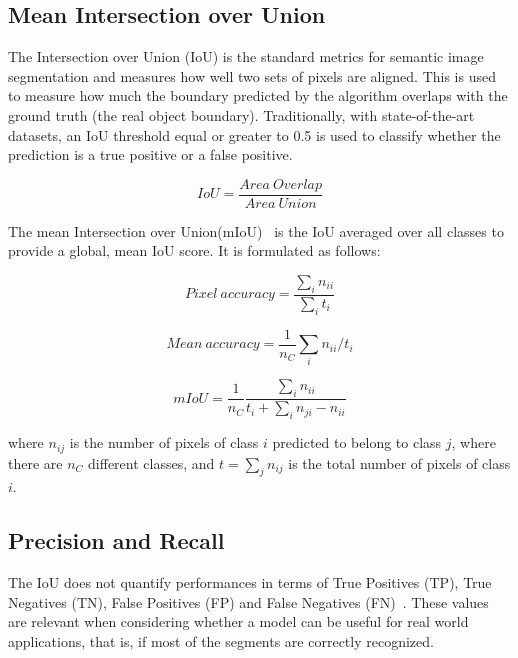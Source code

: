 \documentclass[oneside, english, bibtex]{kththesis}
\begin{document}
\subsection{Mean Intersection over Union}

The Intersection over Union (IoU) is the standard metrics for semantic image segmentation and measures how well two sets of pixels are aligned. This is used to measure how much the boundary predicted by the algorithm overlaps with the ground truth (the real object boundary). Traditionally, with state-of-the-art datasets, an IoU threshold equal or greater to 0.5 is used to classify whether the prediction is a true positive or a false positive.

\begin{equation}
	IoU = \frac{Area \: Overlap}{Area \: Union}
  	\label{eqn:iou}
\end{equation}

The mean Intersection over Union(mIoU)~\cite{DBLP:journals/corr/LongSD14} is the IoU averaged over all classes to provide a global, mean IoU score. It is formulated as follows:

\begin{equation}
	Pixel \: accuracy = \frac{\sum_{i} n_{ii}}{\sum_{i}t_i}
  	\label{eqn:pixelacc}
\end{equation}

\begin{equation}
	Mean \: accuracy = \frac{1}{n_C} \sum_{i} n_{ii} / t_i
  	\label{eqn:meanacc}
\end{equation}

\begin{equation}
	mIoU = \frac{1}{n_C} \frac{\sum_{i} n_{ii}}{t_i + \sum_{i} n_{ji} - n_{ii}}
  	\label{eqn:meanIoU}
\end{equation}

where $n_{ij}$ is the number of pixels of class $i$ predicted to belong to class $j$, where there are $n_{C}$ different classes, and $t = \sum_{j} n_{ij}$ is the total number of pixels of class $i$.

\subsection{Precision and Recall}

The IoU does not quantify performances in terms of True Positives (TP), True Negatives (TN), False Positives (FP) and False Negatives (FN)~\cite{davis2006relationship}. These values are relevant when considering whether a model can be useful for real world applications, that is, if most of the segments are correctly recognized.
\end{document}
